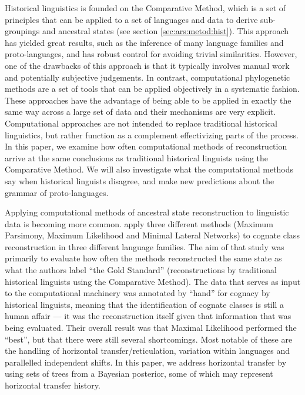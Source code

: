 \documentclass[a4paper,10pt]{article} %
\begin{document}
Historical linguistics is founded on the Comparative Method, which is a set of principles that can be applied to a set of languages and data to derive sub-groupings and ancestral states (see section \ref{sec:ars:metod:hist}). This approach has yielded great results, such as the inference of many language families and proto-languages, and has robust control for avoiding trivial similarities. However, one of the drawbacks of this approach is that it typically involves manual work and potentially subjective judgements. In contrast, computational phylogenetic methods are a set of tools that can be applied objectively in a systematic fashion. These approaches have the advantage of being able to be applied in exactly the same way across a large set of data and their mechanisms are very explicit. Computational approaches are not intended to replace traditional historical linguistics, but rather function as a complement effectivizing parts of the process. In this paper, we examine how often computational methods of reconstruction arrive at the same conclusions as traditional historical linguists using the Comparative Method. We will also investigate what the computational methods say when historical linguists disagree, and make new predictions about the grammar of proto-languages.

Applying computational methods of ancestral state reconstruction to linguistic data is becoming more common. \citet{jager2018using} apply three different methods (Maximum Parsimony, Maximum Likelihood and Minimal Lateral Networks) to cognate class reconstruction in three different language families. The aim of that study was primarily to evaluate how often the methods reconstructed the same state as what the authors label ``the Gold Standard'' (reconstructions by traditional historical linguists using the Comparative Method). The data that serves as input to the computational machinery was annotated by ``hand'' for cognacy by historical linguists, meaning that the identification of cognate classes is still a human affair --- it was the reconstruction itself given that information that was being evaluated. Their overall result was that Maximal Likelihood performed the ``best'', but that there were still several shortcomings. Most notable of these are the handling of horizontal transfer/reticulation, variation within languages and parallelled independent shifts. In this paper, we address horizontal transfer by using sets of trees from a Bayesian posterior, some of which may represent horizontal transfer history.
\end{document}
